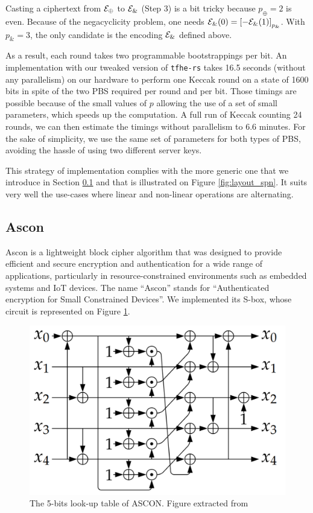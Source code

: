 Casting a ciphertext from $\mathcal{E}_\oplus$ to $\mathcal{E}_\&$ (Step 3) is a bit tricky because $p_\oplus = 2$ is even. Because of the negacyclicity problem, one needs $\mathcal{E}_\&(0) = \left [ -\mathcal{E}_\&(1) \right ]_{p_\&}$. With $p_\& = 3$, the only candidate is the encoding $\mathcal{E}_\&$ defined above.


As a result, each round takes two programmable bootstrappings per bit. An implementation with our tweaked version of \texttt{tfhe-rs} takes 16.5 seconds (without any parallelism) on our hardware to perform one Keccak round on a state of 1600 bits in spite of the two \gls{PBS} required per round and per bit. Those timings are possible because of the small values of $p$ allowing the use of a set of  small parameters, which speeds up the computation. A full run of Keccak counting 24 rounds, we can then estimate the timings without parallelism to $6.6$ minutes. For the sake of simplicity, we use the same set of parameters for both types of \gls{PBS}, avoiding the hassle of using two different server keys.


This strategy of implementation complies with the more generic one that we introduce in Section \ref{sec:ascon} and that is illustrated on Figure \ref{fig:layout_spn}. It suits very well the use-cases where linear and non-linear operations are alternating.


\subsection{Ascon}
\label{sec:ascon}


Ascon \cite{JC:DEMS21, asconv12nist} is a lightweight block cipher algorithm that was designed to provide efficient and secure encryption and authentication for a wide range of applications, particularly in resource-constrained environments such as embedded systems and IoT devices. The name ``Ascon'' stands for ``Authenticated encryption for Small Constrained Devices''. We implemented its \gls{S-box}, whose circuit is represented on Figure \ref{fig:ascon}.

\begin{figure}[h]
    \centering
    \includegraphics[width=0.5\linewidth]{img/to_harmonize/ascon.png}
    \caption{The 5-bits look-up table of ASCON. Figure extracted from \cite{JC:DEMS21}}
    \label{fig:ascon}
\end{figure}



